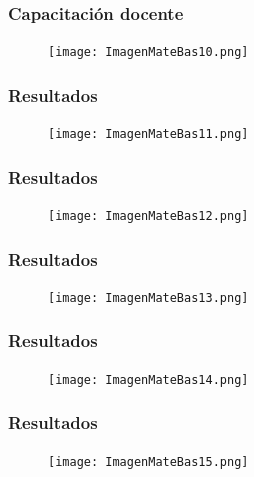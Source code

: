 \documentclass[11pt]{beamer}
\begin{document}
\begin{frame}
\frametitle{Capacitación docente}
    \begin{figure}
    \centering
     \texttt{[image: ImagenMateBas10.png]}
    \end{figure}
\end{frame}

\begin{frame}
\frametitle{Resultados}
    \begin{figure}
    \centering
     \texttt{[image: ImagenMateBas11.png]}
    \end{figure}
\end{frame}

\begin{frame}
\frametitle{Resultados}
    \begin{figure}
    \centering
     \texttt{[image: ImagenMateBas12.png]}
    \end{figure}
\end{frame}

\begin{frame}
\frametitle{Resultados}
    \begin{figure}
    \centering
     \texttt{[image: ImagenMateBas13.png]}
    \end{figure}
\end{frame}

\begin{frame}
\frametitle{Resultados}
    \begin{figure}
    \centering
     \texttt{[image: ImagenMateBas14.png]}
    \end{figure}
\end{frame}

\begin{frame}
\frametitle{Resultados}
    \begin{figure}
    \centering
     \texttt{[image: ImagenMateBas15.png]}
    \end{figure}
\end{frame}
\end{document}
